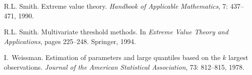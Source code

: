 \documentclass[11pt,letterpaper]{article}
\numberwithin{equation}{section}
\begin{document}
\begin{thebibliography}{29}
R.L. Smith.
\newblock Extreme value theory.
\newblock \emph{Handbook of Applicable Mathematics}, 7: 437--471,
  1990.

R.L. Smith.
\newblock Multivariate threshold methods.
\newblock In \emph{Extreme Value Theory and Applications}, pages 225--248.
  Springer, 1994.

I.~Weissman.
\newblock Estimation of parameters and large quantiles based on the $k$ largest
  observations.
\newblock \emph{Journal of the American Statistical Association}, 73:
  812--815, 1978.

\end{thebibliography}


\clearpage


\clearpage

\end{document}
